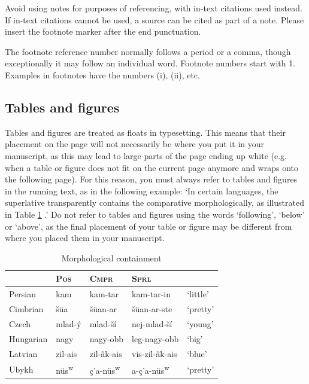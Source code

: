 \documentclass[charis,linguex,biblatex]{glossa}
\begin{document}
Avoid using notes for purposes of referencing, with in-text citations used instead. If in-text citations cannot be used, a source can be cited as part of a note. Please insert the footnote marker after the end punctuation.

The footnote reference number normally follows a period or a comma, though exceptionally it may follow an individual word. Footnote numbers start with 1. Examples in footnotes have the numbers (i), (ii), etc.

\subsection{Tables and figures}

Tables and figures are treated as floats in typesetting. This means that their placement on the page will not necessarily be where you put it in your manuscript, as this may lead to large parts of the page ending up white (e.g. when a table or figure does not fit on the current page anymore and wraps onto the following page). For this reason, you must always refer to tables and figures in the running text, as in the following example: `In certain languages, the superlative transparently contains the comparative morphologically, as illustrated in Table \ref{tbl:table1} \citep[46]{Bobaljik2012}.' Do not refer to tables and figures using the words `following', `below' or `above', as the final placement of your table or figure may be different from where you placed them in your manuscript.

\begin{table}[h]
\sffamily
\centering
\caption{Morphological containment}	
\begin{tabular}{lllll}
 & \textsc{Pos} & \textsc{Cmpr} & \textsc{Sprl}\\
\hline 
Persian & kam & kam-tar & kam-tar-in & ‘little’\\
Cimbrian & šüa & šüan-ar & šüan-ar-ste & ‘pretty’ \\
Czech & mlad-ý & mlad-ší & nej-mlad-ší & ‘young’\\
Hungarian & nagy & nagy-obb & leg-nagy-obb & ‘big’\\
Latvian & zil-ais & zil-âk-ais & vis-zil-âk-ais & ‘blue’\\
Ubykh &  nüs\textsuperscript{w}\textipa{@} & ç’a-nüs\textsuperscript{w}\textipa{@} & a-ç’a-nüs\textsuperscript{w}\textipa{@} & ‘pretty’ \\
\end{tabular}\label{tbl:table1}
\end{table}
\end{document}
